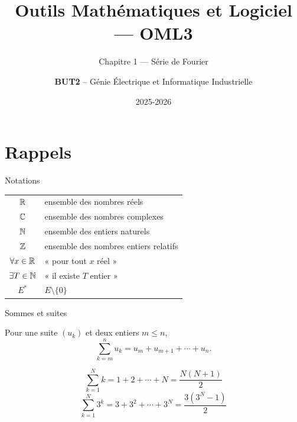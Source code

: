 \documentclass[aspectratio=43,10pt]{beamer}
\title{Outils Mathématiques et Logiciel --- OML3}
\subtitle{Chapitre 1 --- Série de Fourier}
\author{\textbf{BUT2} -- Génie Électrique et Informatique Industrielle}
\date{2025-2026}
\begin{document}

\maketitle


\section{Rappels}

\begin{frame}{Notations}
    \begin{center}
    \renewcommand{\arraystretch}{1.3}
    \begin{tabular}{cl}
        ${\mathbb{R}}$ & ensemble des nombres réels \\
        ${\mathbb{C}}$ & ensemble des nombres complexes \\
        ${\mathbb{N}}$ & ensemble des entiers naturels \\
        ${\mathbb{Z}}$ & ensemble des nombres entiers relatifs \\
        $\forall x\in{\mathbb{R}}$ & « pour tout $x$ réel » \\
        $\exists T\in{\mathbb{N}}$ & « il existe $T$ entier » \\
        $E^*$ & $E\setminus\{0\}$
    \end{tabular}
    \end{center}
\end{frame}

\begin{frame}{Sommes et suites}
    \begin{definition}[Somme]
        Pour une suite $(u_k)$ et deux entiers $m\leq n$,
        \[
            \sum_{k=m}^{n} u_k = u_m + u_{m+1} + \cdots + u_n.
        \]
    \end{definition}
    \[
        \sum_{k=1}^{N} k = 1+2+\cdots+N = \frac{N(N+1)}{2}
    \]
    \[
        \sum_{k=1}^{N} 3^k = 3+3^2+\cdots+3^N = \frac{3\left(3^N-1\right)}{2}
    \]
\end{frame}
\end{document}
